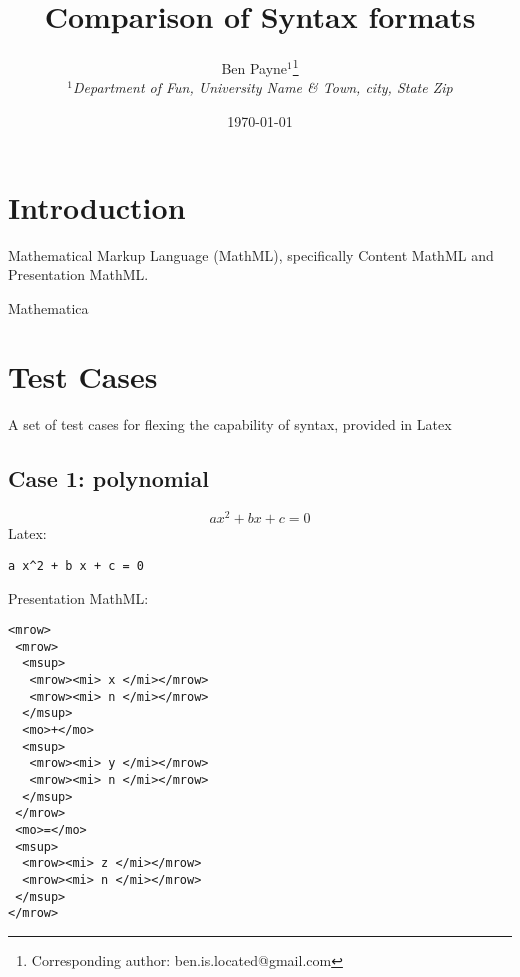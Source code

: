 \documentclass{article}
\begin{document}
\title{Comparison of Syntax formats}

\author{Ben Payne$^{1}$\footnote{Corresponding author: ben.is.located@gmail.com}\\
{\it $^{1}$Department of Fun, University Name \& Town, city, State Zip}}

\date{\today}


\maketitle %
\begin{multicols}{2}



\section{Introduction}

Mathematical Markup Language (MathML)\cite{2014_MathML}, specifically Content MathML and Presentation MathML.

Mathematica\cite{2014_mathematica}


\section{Test Cases}
A set of test cases for flexing the capability of syntax, provided in Latex

\subsection{Case 1: polynomial}

\begin{equation}
a x^2 + b x + c = 0
\label{eq:polynomial_case1}
\end{equation}
Latex: 
\begin{verbatim}
a x^2 + b x + c = 0
\end{verbatim}

Presentation MathML:
\begin{verbatim}
<mrow>
 <mrow>
  <msup>
   <mrow><mi> x </mi></mrow>
   <mrow><mi> n </mi></mrow>
  </msup>
  <mo>+</mo>
  <msup>
   <mrow><mi> y </mi></mrow>
   <mrow><mi> n </mi></mrow>
  </msup>
 </mrow>
 <mo>=</mo>
 <msup>
  <mrow><mi> z </mi></mrow>
  <mrow><mi> n </mi></mrow>
 </msup>
</mrow>
\end{verbatim}


\end{multicols}
\end{document}

